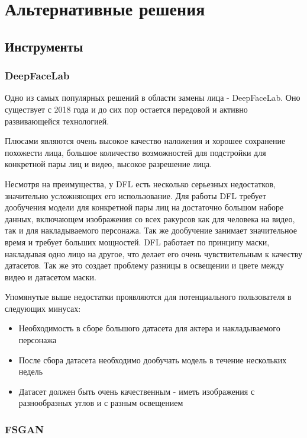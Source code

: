 \section{Альтернативные решения}

\subsection{Инструменты}

\subsubsection{DeepFaceLab}

Одно из самых популярных решений в области замены лица - DeepFaceLab\cite{deepfacelab}. Оно существует с 2018 года и до сих пор остается передовой и активно развивающейся технологией.

Плюсами являются очень высокое качество наложения и хорошее сохранение похожести лица, большое количество возможностей для подстройки для конкретной пары лиц и видео, высокое разрешение лица.

Несмотря на преимущества, у DFL есть несколько серьезных недостатков, значительно усложняющих его использование. Для работы DFL требует дообучения модели для конкретной пары лиц на достаточно большом наборе данных, включающем изображения со всех ракурсов как для человека на видео, так и для накладываемого персонажа.
Так же дообучение занимает значительное время и требует больших мощностей.
DFL работает по принципу маски, накладывая одно лицо на другое, что делает его очень чувствительным к качеству датасетов. Так же это создает проблему разницы в освещении и цвете между видео и датасетом маски.

Упомянутые выше недостатки проявляются для потенциального пользователя в следующих минусах:

\begin{itemize}
    \item Необходимость в сборе большого датасета для актера и накладываемого персонажа
    \item После сбора датасета необходимо дообучать модель в течение нескольких недель
    \item Датасет должен быть очень качественным - иметь изображения с разнообразных углов и с разным освещением
\end{itemize}

\subsubsection{FSGAN}

